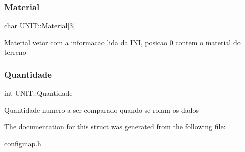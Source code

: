 \subsubsection{\texorpdfstring{Material}{Material}}
{\footnotesize\ttfamily char U\+N\+I\+T\+::\+Material\mbox{[}3\mbox{]}}

Material vetor com a informacao lida da I\+NI, posicao 0 contem o material do terreno \mbox{\label{struct_u_n_i_t_a1878ea7b1f85a363ffd2ceeefff6e1ee}} 
\subsubsection{\texorpdfstring{Quantidade}{Quantidade}}
{\footnotesize\ttfamily int U\+N\+I\+T\+::\+Quantidade}

Quantidade numero a ser comparado quando se rolam os dados 

The documentation for this struct was generated from the following file\+:\begin{DoxyCompactItemize}
\item 
configmap.\+h\end{DoxyCompactItemize}

